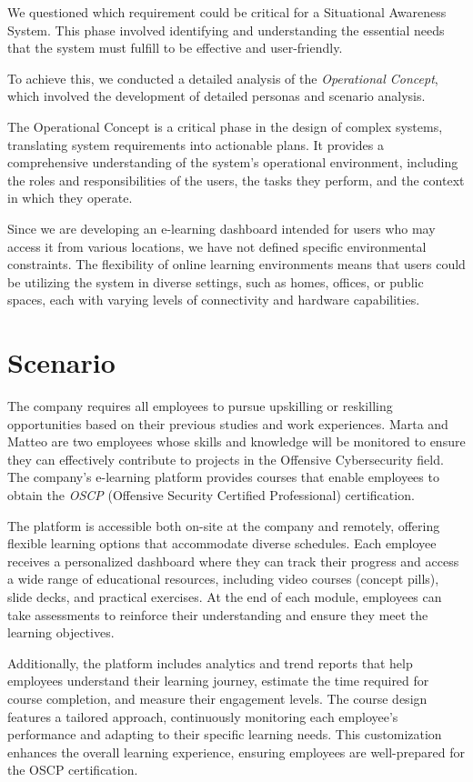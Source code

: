 We questioned which requirement could be critical for a Situational Awareness System. This phase involved identifying and understanding the essential needs that the system must fulfill to be effective and user-friendly. 

To achieve this, we conducted a detailed analysis of the \textit{Operational Concept}, which involved the development of detailed personas and scenario analysis. 

The Operational Concept is a critical phase in the design of complex systems, translating system requirements into actionable plans. 
It provides a comprehensive understanding of the system's operational environment, including the roles and responsibilities of the users, the tasks they perform, and the context in which they operate.

Since we are developing an e-learning dashboard intended for users who may access it from various locations, we have not defined specific environmental constraints. The flexibility of online learning environments means that users could be utilizing the system in diverse settings, such as homes, offices, or public spaces, each with varying levels of connectivity and hardware capabilities.

\section{Scenario}
The company requires all employees to pursue upskilling or reskilling opportunities based on their previous studies and work experiences. Marta and Matteo are two employees whose skills and knowledge will be monitored to ensure they can effectively contribute to projects in the Offensive Cybersecurity field. The company’s e-learning platform provides courses that enable employees to obtain the \textit{OSCP} (Offensive Security Certified Professional) certification.

The platform is accessible both on-site at the company and remotely, offering flexible learning options that accommodate diverse schedules. Each employee receives a personalized dashboard where they can track their progress and access a wide range of educational resources, including video courses (concept pills), slide decks, and practical exercises. At the end of each module, employees can take assessments to reinforce their understanding and ensure they meet the learning objectives.

Additionally, the platform includes analytics and trend reports that help employees understand their learning journey, estimate the time required for course completion, and measure their engagement levels. The course design features a tailored approach, continuously monitoring each employee’s performance and adapting to their specific learning needs. This customization enhances the overall learning experience, ensuring employees are well-prepared for the OSCP certification.

